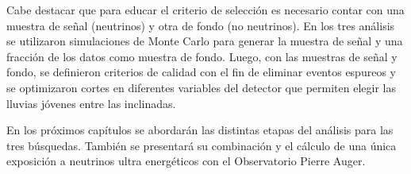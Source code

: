 Cabe destacar que para educar el criterio de selección es necesario contar con una muestra de señal (neutrinos) y otra de fondo (no neutrinos).
En los tres análisis se utilizaron simulaciones de Monte Carlo para generar la muestra de señal y una fracción de los datos como muestra de fondo.
Luego, con las muestras de señal y fondo, se definieron criterios de calidad con el fin de eliminar eventos espureos y se optimizaron cortes en diferentes variables del detector que permiten elegir las lluvias jóvenes entre las inclinadas. 

En los próximos capítulos se abordarán las distintas etapas del análisis para las tres búsquedas.
Tambi\'en se presentar\'a su combinaci\'on y el c\'alculo de una \'unica exposici\'on a neutrinos ultra energ\'eticos con el Observatorio Pierre Auger.

\fi


